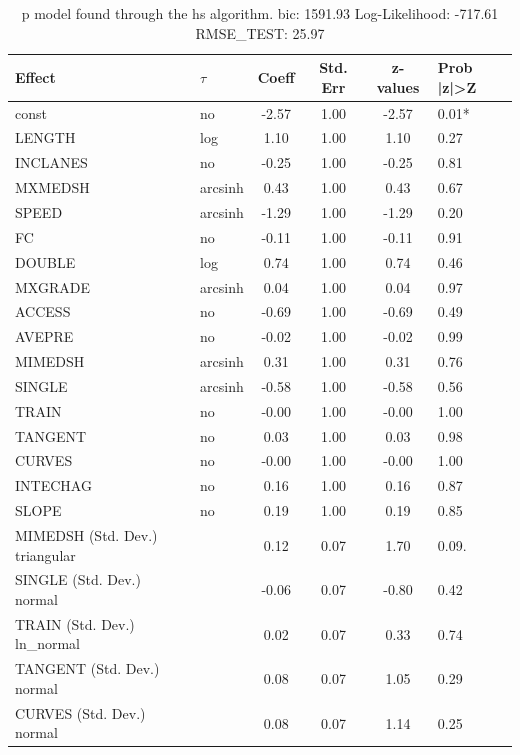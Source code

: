 \begin{table}
	\caption{p model found through the hs algorithm. bic: 1591.93 Log-Likelihood: -717.61 RMSE_TEST: 25.97}
	\begin{center}
		\begin{tabular}{|l|l|c|c|c|l|}
			\hline
			Effect & $\tau$ & Coeff & Std. Err & z-values & Prob |z|>Z \\
			\hline
			const & no & -2.57 & 1.00 & -2.57 & 0.01* \\
			\hline
			LENGTH & log & 1.10 & 1.00 & 1.10 & 0.27 \\
			\hline
			INCLANES & no & -0.25 & 1.00 & -0.25 & 0.81 \\
			\hline
			MXMEDSH & arcsinh & 0.43 & 1.00 & 0.43 & 0.67 \\
			\hline
			SPEED & arcsinh & -1.29 & 1.00 & -1.29 & 0.20 \\
			\hline
			FC & no & -0.11 & 1.00 & -0.11 & 0.91 \\
			\hline
			DOUBLE & log & 0.74 & 1.00 & 0.74 & 0.46 \\
			\hline
			MXGRADE & arcsinh & 0.04 & 1.00 & 0.04 & 0.97 \\
			\hline
			ACCESS & no & -0.69 & 1.00 & -0.69 & 0.49 \\
			\hline
			AVEPRE & no & -0.02 & 1.00 & -0.02 & 0.99 \\
			\hline
			MIMEDSH & arcsinh & 0.31 & 1.00 & 0.31 & 0.76 \\
			\hline
			SINGLE & arcsinh & -0.58 & 1.00 & -0.58 & 0.56 \\
			\hline
			TRAIN & no & -0.00 & 1.00 & -0.00 & 1.00 \\
			\hline
			TANGENT & no & 0.03 & 1.00 & 0.03 & 0.98 \\
			\hline
			CURVES & no & -0.00 & 1.00 & -0.00 & 1.00 \\
			\hline
			INTECHAG & no & 0.16 & 1.00 & 0.16 & 0.87 \\
			\hline
			SLOPE & no & 0.19 & 1.00 & 0.19 & 0.85 \\
			\hline
			MIMEDSH (Std. Dev.) triangular &  & 0.12 & 0.07 & 1.70 & 0.09. \\
			\hline
			SINGLE (Std. Dev.) normal &  & -0.06 & 0.07 & -0.80 & 0.42 \\
			\hline
			TRAIN (Std. Dev.) ln_normal &  & 0.02 & 0.07 & 0.33 & 0.74 \\
			\hline
			TANGENT (Std. Dev.) normal &  & 0.08 & 0.07 & 1.05 & 0.29 \\
			\hline
			CURVES (Std. Dev.) normal &  & 0.08 & 0.07 & 1.14 & 0.25 \\

\end{tabular}
\end{center}
\end{table}
